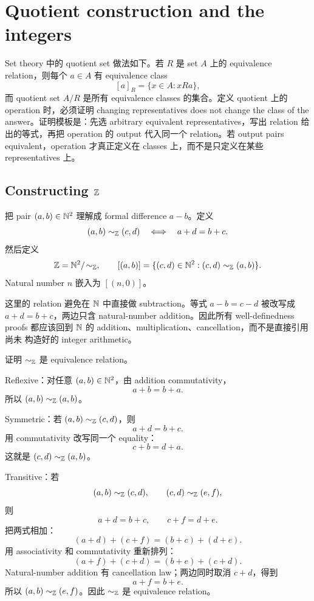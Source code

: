 \section{Quotient construction and the integers}

Set theory 中的 quotient set 做法如下。若 \(R\) 是 set \(A\) 上的 equivalence
relation，则每个 \(a\in A\) 有 equivalence class
\[
  [a]_R=\{x\in A:xRa\},
\]
而 quotient set \(A/R\) 是所有 equivalence classes 的集合。定义 quotient 上的
operation 时，必须证明 changing representatives does not change the class of the
answer。证明模板是：先选 arbitrary equivalent representatives，写出 relation
给出的等式，再把 operation 的 output 代入同一个 relation。若 output pairs
equivalent，operation 才真正定义在 classes 上，而不是只定义在某些 representatives
上。

\subsection{Constructing \texorpdfstring{\(\mathbb{Z}\)}{Z}}

把 pair \((a,b)\in\mathbb{N}^2\) 理解成 formal difference \(a-b\)。定义
\[
  (a,b)\sim_{\mathbb{Z}}(c,d)\quad\Longleftrightarrow\quad a+d=b+c.
\]
然后定义
\[
  \mathbb{Z}=\mathbb{N}^2/\!\sim_{\mathbb{Z}},\qquad [(a,b)]=\{(c,d)\in\mathbb{N}^2:(c,d)\sim_{\mathbb{Z}}(a,b)\}.
\]
Natural number \(n\) 嵌入为 \([(n,0)]\)。

这里的 relation 避免在 \(\mathbb{N}\) 中直接做 subtraction。等式 \(a-b=c-d\) 被改写成
\(a+d=b+c\)，两边只含 natural-number addition。因此所有 well-definedness proofs
都应该回到 \(\mathbb{N}\) 的 addition、multiplication、cancellation，而不是直接引用尚未
构造好的 integer arithmetic。

\begin{exerciseblock}
证明 \(\sim_{\mathbb{Z}}\) 是 equivalence relation。
\end{exerciseblock}

\begin{solution}
Reflexive：对任意 \((a,b)\in\mathbb{N}^2\)，由 addition commutativity，
\[
  a+b=b+a.
\]
所以 \((a,b)\sim_{\mathbb{Z}}(a,b)\)。

Symmetric：若 \((a,b)\sim_{\mathbb{Z}}(c,d)\)，则
\[
  a+d=b+c.
\]
用 commutativity 改写同一个 equality：
\[
  c+b=d+a.
\]
这就是 \((c,d)\sim_{\mathbb{Z}}(a,b)\)。

Transitive：若
\[
  (a,b)\sim_{\mathbb{Z}}(c,d),\qquad (c,d)\sim_{\mathbb{Z}}(e,f),
\]
则
\[
  a+d=b+c,\qquad c+f=d+e.
\]
把两式相加：
\[
  (a+d)+(c+f)=(b+c)+(d+e).
\]
用 associativity 和 commutativity 重新排列：
\[
  (a+f)+(c+d)=(b+e)+(c+d).
\]
Natural-number addition 有 cancellation law；两边同时取消 \(c+d\)，得到
\[
  a+f=b+e.
\]
所以 \((a,b)\sim_{\mathbb{Z}}(e,f)\)。因此 \(\sim_{\mathbb{Z}}\) 是 equivalence relation。
\end{solution}

